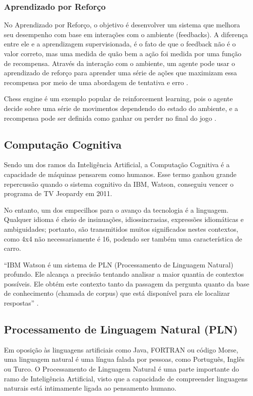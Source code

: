 \documentclass[
	12pt,				%
	openright,			%
	oneside,			%
	a4paper,			%
	english,			%
	spanish,			%
	brazil				%
	]{abntex2}
\begin{document}
	\subsubsection*{Aprendizado por Reforço}
		No Aprendizado por Reforço, o objetivo é desenvolver um sistema que melhora seu desempenho com base em interações com o ambiente (feedbacks). A diferença entre ele e a aprendizagem supervisionada, é o fato de que o feedback não é o valor correto, mas uma medida de quão bem a ação foi medida por uma função de recompensa. Através da interação com o ambiente, um agente pode usar o aprendizado de reforço para aprender uma série de ações que maximizam essa recompensa por meio de uma abordagem de tentativa e erro \cite{ r_julian_heart}.

		Chess engine é um exemplo popular de reinforcement learning, pois o agente decide sobre uma série de movimentos dependendo do estado do ambiente, e a recompensa pode ser definida como ganhar ou perder no final do jogo \cite{r_julian_heart}.  %
	
	
	\subsection{Computação Cognitiva}

	Sendo um dos ramos da Inteligência Artificial, a Computação Cognitiva é a capacidade de máquinas pensarem como humanos. Esse termo ganhou grande repercussão quando o sistema cognitivo da IBM, Watson, conseguiu vencer o programa de TV Jeopardy em 2011.

	No entanto, um dos empecilhos para o avanço da tecnologia é a linguagem. Qualquer idioma é cheio de insinuações, idiossincrasias, expressões idiomáticas e ambiguidades; portanto, são transmitidos muitos significados nestes contextos, como 4x4 não necessariamente é 16, podendo ser também uma característica de carro.

	``IBM Watson é um sistema de PLN (Processamento de Linguagem Natural) profundo. Ele alcança a precisão tentando analisar a maior quantia de contextos possíveis. Ele obtém este contexto tanto da passagem da pergunta quanto da base de conhecimento (chamada de corpus) que está disponível para ele localizar respostas'' \cite{watson_manual}. 

	\subsection{Processamento de Linguagem Natural (PLN)}
	Em oposição às linguagens artificiais como Java, FORTRAN ou código Morse, uma linguagem natural é uma língua falada por pessoas, como Português, Inglês ou Turco. O Processamento de Linguagem Natural é uma parte importante do ramo de Inteligência Artificial, visto que a capacidade de compreender linguagens naturais está intimamente ligada ao pensamento humano. %
	
\end{document}

